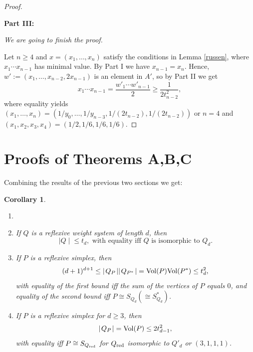 \documentclass[a4paper,twoside]{article}
\newcommand{\card}[1]{{\mid\! #1 \!\mid}}
\def\Qred{{Q_{\rm red}}}
\def\vol{{\rm Vol}}
\newtheorem{corollary}[theorem]{Corollary}
\begin{document}
\begin{proof}
\begin{enumerate}
\begin{enumerate}
\end{enumerate}

\end{enumerate}

\textbf{Part III:}

{\em We are going to finish the proof.} 

\smallskip

Let $n \geq 4$ and $x = (x_1, \ldots, x_n)$ satisfy the conditions in Lemma \ref{russen}, where $x_1 \cdots x_{n-1}$ has minimal value. 
By Part I we have $x_{n-1} = x_n$. Hence, $w' := (x_1, \ldots, x_{n-2}, 2 x_{n-1})$ is an element in $A'$, so by Part II we get 
\[x_1 \cdots x_{n-1} = \frac{w'_1 \cdots w'_{n-1}}{2} \geq \frac{1}{2 t_{n-2}^2},\]
where equality yields $(x_1, \ldots, x_n) = 
(1/y_0, \ldots, 1/y_{n-3}, 1/(2 t_{n-2}), 1/(2 t_{n-2}))$ or 
$n=4$ and $(x_1,x_2,x_3,x_4) = (1/2,1/6,1/6,1/6)$.

\end{proof}

\section{Proofs of Theorems A,B,C}

Combining the results of the previous two sections we get:

\begin{corollary}
\begin{enumerate}
\item[]
\item If $Q$ is a reflexive weight system of length $d$, then
\[\card{Q} \leq t_d, \text{ with equality iff $Q$ is isomorphic to $Q_d$}.\]

\item If $P$ is a reflexive simplex, then
\[(d+1)^{d+1} \leq \card{Q_P} \card{Q_{P^*}} = \vol(P) \vol(P^*) \leq t^2_d,\]
with equality of the first bound iff the sum of the vertices of $P$ equals $0$, 
and equality of the second bound iff $P \cong S_{Q_d} (\cong S^*_{Q_d})$.

\item If $P$ is a reflexive simplex for $d\geq 3$, then
\[\card{Q_P} = \vol(P) \leq 2 t_{d-1}^2,\]
with equality iff $P \cong S_{\Qred}$ for $\Qred$ isomorphic to $Q'_d$ or $(3,1,1,1)$.
\end{enumerate}
\label{qbound}
\end{corollary}
\end{document}
